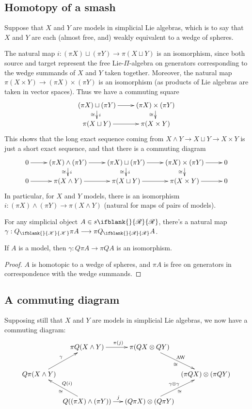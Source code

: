 \documentclass[10pt]{article}
\newcommand{\PRLie}[1]%
{\ifblank{#1}{\scrR}{\scrR^{#1}}}
\newcommand{\LL}[1]{\ifblank{#1}{\scrK}{\scrK^{#1}}}
\begin{document}
\begin{Grothendieck Multiplicativity}
\subsection{Homotopy of a smash}
Suppose that $X$ and $Y$ are models in simplicial Lie algebras, which is to say that $X$ and $Y$ are each (almost free, and) weakly equivalent to a wedge of spheres. 

The natural map $i:(\pi X)\sqcup (\pi Y)\to \pi(X\sqcup Y)$ is an isomorphism, since both source and target represent the free Lie-$\Pi$-algebra on generators corresponding to the wedge summands of $X$ and $Y$ taken together. Moreover, the natural map $\pi(X\times Y)\to (\pi X)\times (\pi Y)$ is an isomorphism (as products of Lie algebras are taken in vector spaces). Thus we have a commuting square
\[\xymatrix@R=4mm{
(\pi X)\sqcup (\pi Y)
\ar[r]
\ar[d]^-{i}_-{\cong}
&%
(\pi X)\times (\pi Y)
\ar[d]_-{\cong}\\
\pi (X\sqcup Y)
\ar[r]
&%
\pi (X\times Y)
}\]
This shows that the long exact sequence coming from $X\wedge Y\to X\sqcup Y\to X\times Y$ is just a short exact sequence, and that there is a commuting diagram
\[\xymatrix@R=4mm{
0\ar[r]&%
(\pi X)\wedge (\pi Y)
\ar[r]
\ar[d]^-{i}_-{\cong}
&%
(\pi X)\sqcup (\pi Y)
\ar[r]
\ar[d]^-{i}_-{\cong}
&%
(\pi X)\times (\pi Y)
\ar[r]
\ar[d]_-{\cong}
&%
0\\%
0\ar[r]&%
\pi (X\wedge  Y)
\ar[r]
&%
\pi (X\sqcup Y)
\ar[r]
&%
\pi (X\times Y)
\ar[r]
&%
0
}\]
In particular, for $X$ and $Y$ models, there is an isomorphism $i:(\pi X)\wedge (\pi Y)\to\pi(X\wedge Y)$ (natural for maps of pairs of models).

For any simplicial object $A\in s\PRLie{}$, there's a natural map $\gamma:Q_{\LL{}}\pi A\to \pi Q_{\PRLie{}}A$.
\begin{lem}
If $A$ is a model, then $\gamma:Q\pi A\to \pi QA$ is an isomorphism.
\end{lem}
\begin{proof}
$A$ is homotopic to a wedge of spheres, and $\pi A$ is free on generators in correspondence with the wedge summands.
\end{proof}

\subsection{A commuting diagram}



Supposing still that $X$ and $Y$ are models in simplicial Lie algebras, we now have a commuting diagram:
\[
\xymatrix@C-2em{
& \pi Q(X\wedge Y) \ar[rr]^{\pi(j)} && \pi(QX\otimes QY) \ar[dr]^{\textup{AW}}_{\cong} \\
Q\pi(X\wedge Y) \ar[ur]^{\gamma} &&&& (\pi QX)\otimes (\pi QY) \ar[dl];[]^{\gamma\otimes\gamma}_{\cong} \\
& Q((\pi X)\wedge (\pi Y)) \ar[ul]^{\cong}_{Q(i)} && (Q\pi X)\otimes (Q\pi Y) \ar[ll];[]^{j}
}
\]



\end{Grothendieck Multiplicativity}
\end{document}
